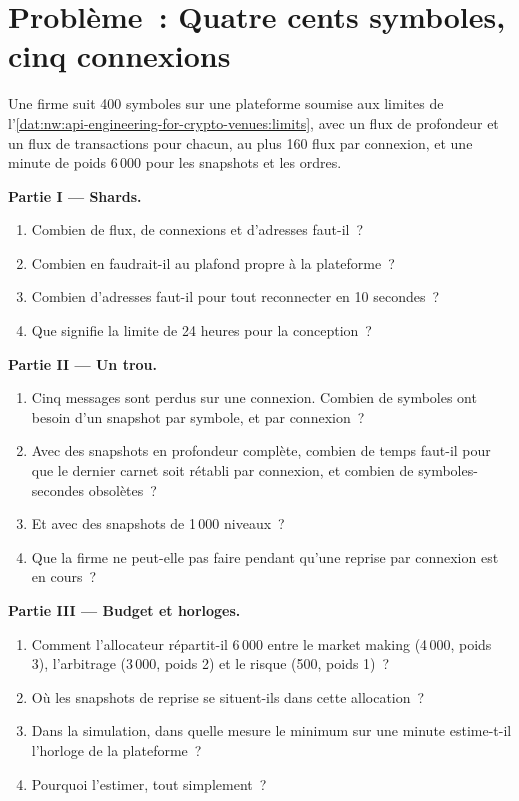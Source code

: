 \section{Problème~: Quatre cents symboles, cinq connexions}

\begin{problem}\label{pb:nw:api-engineering-for-crypto-venues:1}
Une firme suit 400 symboles sur une plateforme soumise aux limites de l'\cref{dat:nw:api-engineering-for-crypto-venues:limits}, avec un flux de profondeur et un flux de transactions pour chacun,
au plus 160 flux par connexion, et une minute de poids 6\,000 pour les snapshots et les ordres.

\medskip\noindent\textbf{Partie I --- Shards.}
\begin{enumerate}
\item Combien de flux, de connexions et d'adresses faut-il~?
\item Combien en faudrait-il au plafond propre à la plateforme~?
\item Combien d'adresses faut-il pour tout reconnecter en 10 secondes~?
\item Que signifie la limite de 24 heures pour la conception~?
\end{enumerate}

\medskip\noindent\textbf{Partie II --- Un trou.}
\begin{enumerate}[resume]
\item Cinq messages sont perdus sur une connexion. Combien de symboles ont besoin d'un snapshot par symbole, et par connexion~?
\item Avec des snapshots en profondeur complète, combien de temps faut-il pour que le dernier carnet soit rétabli par connexion, et combien de symboles-secondes obsolètes~?
\item Et avec des snapshots de 1\,000 niveaux~?
\item Que la firme ne peut-elle pas faire pendant qu'une reprise par connexion est en cours~?
\end{enumerate}

\medskip\noindent\textbf{Partie III --- Budget et horloges.}
\begin{enumerate}[resume]
\item Comment l'allocateur répartit-il 6\,000 entre le market making (4\,000, poids 3), l'arbitrage (3\,000, poids 2) et le risque (500, poids 1)~?
\item Où les snapshots de reprise se situent-ils dans cette allocation~?
\item Dans la simulation, dans quelle mesure le minimum sur une minute estime-t-il l'horloge de la plateforme~?
\item Pourquoi l'estimer, tout simplement~?
\end{enumerate}


\end{problem}
